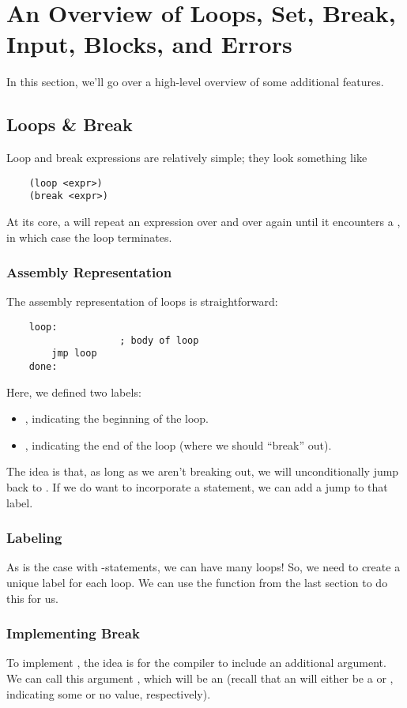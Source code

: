 \section{An Overview of Loops, Set, Break, Input, Blocks, and Errors}
In this section, we'll go over a high-level overview of some additional features. 

\subsection{Loops \& Break}
Loop and break expressions are relatively simple; they look something like 
\begin{verbatim}
    (loop <expr>)
    (break <expr>)\end{verbatim}
At its core, a  will repeat an expression over and over again until it encounters a , in which case the loop terminates.

\subsubsection{Assembly Representation} 
The assembly representation of loops is straightforward:
\begin{verbatim}
    loop: 
                    ; body of loop 
        jmp loop 
    done:\end{verbatim}
Here, we defined two labels: 
\begin{itemize}
    \item {}, indicating the beginning of the loop. 
    \item {}, indicating the end of the loop (where we should ``break'' out).
\end{itemize}
The idea is that, as long as we aren't breaking out, we will unconditionally jump back to . If we do want to incorporate a  statement, we can add a jump to that label.

\subsubsection{Labeling}
As is the case with -statements, we can have many loops! So, we need to create a unique label for each loop. We can use the  function from the last section to do this for us. 

\subsubsection{Implementing Break}
To implement , the idea is for the compiler to include an additional argument. We can call this argument , which will be an  (recall that an  will either be a  or , indicating some or no value, respectively).

